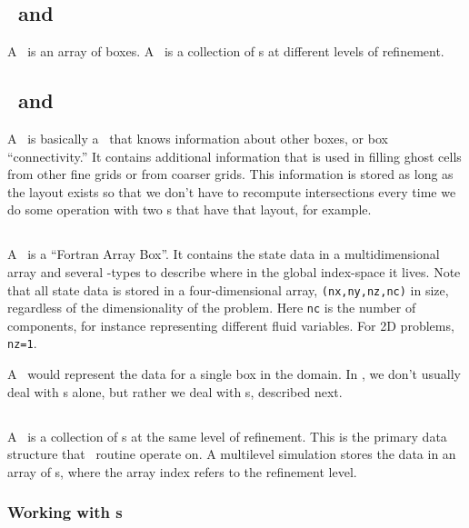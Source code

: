 \subsection{\boxarray\ and \mlboxarray}

A \boxarray\ is an array of boxes.  A \mlboxarray\ is a collection of
\boxarray s at different levels of refinement.

\subsection{\layout\ and \mllayout}

A \layout\ is basically a \boxarray\ that knows information about other
boxes, or box ``connectivity.''  It contains additional information
that is used in filling ghost cells from other fine grids or from
coarser grids.  This information is stored as long as the layout
exists so that we don't have to recompute intersections every time we
do some operation with two \multifab s that have that layout, for
example.


\subsection{\fab}

A \fab\ is a ``Fortran Array Box''.  It contains the state data in a
multidimensional array and several \boxtype-types to describe where in
the global index-space it lives.  
Note that all state data is stored in a four-dimensional array,
{\tt (nx,ny,nz,nc)} in size, regardless of the dimensionality of the
problem.  Here {\tt nc} is the number of components, for instance
representing different fluid variables.  For 2D problems, {\tt nz=1}.

A \fab\ would represent the data for a single box in the domain.
In \maestro, we don't usually deal with \fab s alone, but rather
we deal with \multifab s, described next.

\subsection{\multifab}

A \multifab\ is a collection of \fab s at the same level of
refinement.  This is the primary data structure that \maestro\
routine operate on.  A multilevel simulation stores the 
data in an array of \multifab s, where the array index refers
to the refinement level.

\subsubsection{Working with \multifab s}

